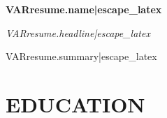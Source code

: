 \documentclass[10pt,letterpaper]{article}
\newcommand{\headervspace}{\vspace{-8pt}}
\newcommand{\contactvspace}{\vspace{2pt}}
\newcommand{\headervspace}{\vspace{-5pt}}
\newcommand{\contactvspace}{\vspace{5pt}}
\newcommand{\resumeHeader}[1]{
  \begin{center}
    {\huge\bfseries #1}
  \end{center}
  \headervspace
}
\newcommand{\resumeContact}[1]{
  \begin{center}
    #1
  \end{center}
  \contactvspace
}
\begin{document}
\fontsize{9.3}{11.3}\selectfont

\resumeHeader{VAR{resume.name|escape_latex}}
\vspace{-10pt}
\resumeContact{
}

\begin{center}
  \textit{VAR{resume.headline|escape_latex}}
\end{center}
\vspace{5pt}

\noindent
VAR{resume.summary|escape_latex}
\vspace{10pt}

\section*{EDUCATION}


\end{document}
